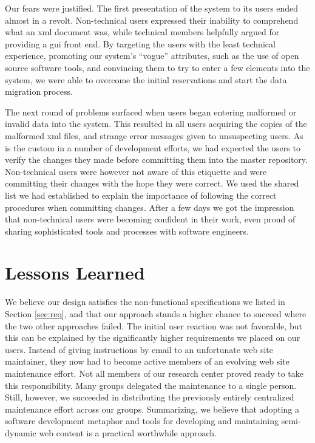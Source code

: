 \documentclass[10pt]{article}
\begin{document}
Our fears were justified.
The first presentation of the system to its users ended
almost in a revolt.
Non-technical users expressed their inability to comprehend
what an {\sc xml} document was, while technical members
helpfully argued for providing a {\sc gui} front end.
By targeting the users with the least technical experience,
promoting our system's ``vogue'' attributes,
such as the use of open source software tools,
and convincing them to try to enter a few elements into
the system, we were able to overcome the initial reservations
and start the data migration process.

The next round of problems surfaced when users began entering
malformed or invalid data into the system.
This resulted in all users acquiring the copies of the malformed
{\sc xml} files, and strange error messages given to unsuspecting
users.
As is the custom in a number of development efforts, we had
expected the users to verify the changes they made before
committing them into the master repository.
Non-technical users were however not aware of this etiquette
and were committing their changes with the hope they were correct.
We used the shared list we had established to explain the
importance of following the correct procedures when committing changes.
After a few days we got the impression that non-technical users
were becoming confident in their work, even proud of sharing
sophisticated tools and processes with software engineers.

\section{Lessons Learned}
\label{sec:concl}
We believe our design satisfies the non-functional specifications
we listed in Section \ref{sec:req},
and that our approach stands a higher chance to succeed where the
two other approaches failed.
The initial user reaction was not favorable, but this can
be explained by the significantly higher requirements we
placed on our users.
Instead of giving instructions by email to an unfortunate
web site maintainer, they now had to become active members
of an evolving web site maintenance effort.
Not all members of our research center proved ready to take
this responsibility.
Many groups delegated the maintenance to a single person.
Still, however, we succeeded in distributing the previously
entirely centralized maintenance effort across our groups.
Summarizing, we believe that adopting a software development
metaphor and tools for developing and maintaining semi-dynamic
web content is a practical worthwhile approach.



\end{document}
